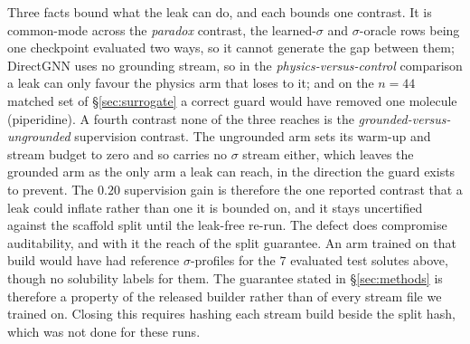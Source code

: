 Three facts bound what the leak can do, and each bounds one contrast. It is
common-mode across the \emph{paradox} contrast, the learned-$\sigma$ and $\sigma$-oracle rows being one
checkpoint evaluated two ways, so it cannot generate the gap between them; DirectGNN uses no
grounding stream, so in the \emph{physics-versus-control} comparison a leak can only favour the physics
arm that loses to it; and on the $n{=}44$ matched set of \S\ref{sec:surrogate} a correct guard would
have removed one molecule (piperidine). A fourth contrast none of the three reaches is the
\emph{grounded-versus-ungrounded} supervision contrast. The ungrounded arm sets its warm-up and
stream budget to zero and so carries no $\sigma$ stream either, which leaves the grounded arm as the
only arm a leak can reach, in the direction the guard exists to prevent. The $0.20$ supervision gain
is therefore the one reported contrast that a leak could inflate rather than one it is bounded on,
and it stays uncertified against the scaffold split until the leak-free re-run.
The defect does compromise auditability, and with it the reach of the split guarantee. An arm
trained on that build would have had reference $\sigma$-profiles for the $7$ evaluated test solutes
above, though no solubility labels for them. The guarantee stated in \S\ref{sec:methods} is
therefore a property of the released builder rather than of every stream file we trained on. Closing this requires hashing each
stream build beside the split hash, which was not done for these runs.
